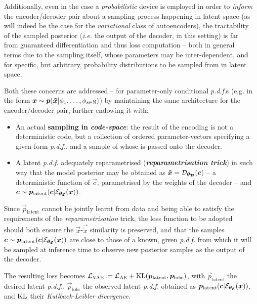 Additionally, even in the case a \textit{probabilistic} device is employed in order to \textit{inform} the encoder/decoder pair about a sampling process happening in latent space (as will indeed be the case for the \textit{variational} class of autoencoders), the tractability of the sampled posterior (\textit{i.e.} the output of the decoder, in this setting) is far from guaranteed \wrt differentiation and thus loss computation -- both in general terms due to the sampling itself, whose parameters may be inter-dependent, and for specific, but arbitrary, probability distributions to be sampled from in latent space.

Both these concerns are addressed -- for parameter-only conditional \textit{p.d.f.}s (e.g. in the form $\bm{x} \sim \bm{p}(\bm{\tilde{x}} | \phi_1, \dots, \phi_{s\in\mathbb{N}})$) by maintaining the same architecture for the encoder/decoder pair, further endowing it with:
\begin{itemize}
    \item An actual \textbf{sampling in \textit{code-space}}: the result of the encoding is not a deterministic code, but a collection of ordered parameter-vectors specifying a given-form \textit{p.d.f.}, and a sample of whose is passed onto the decoder.
    \item A latent \textit{p.d.f.} adequately reparametrised (\textbf{\textit{reparametrisation trick}}) in such way that the model posterior may be obtained as $\bm{\tilde{x}} = \mathcal{D}_{\bm{\theta_{\mathcal{D}}}}(\bm{c})$ -- a deterministic function of $\vec{c}$, parametrised by the weights of the decoder -- and $\bm{c} \sim \bm{p}_{\text{latent}}(\bm{c}| \mathcal{E}_{\bm{\theta_{\mathcal{E}}}}(\bm{x}))$.
\end{itemize}

Since $\vec{p}_{\text{latent}}$ cannot be jointly learnt from data and being able to satisfy the requirements of the \textit{reparametrisation} trick, the loss function to be adopted should both ensure the $\vec{x}$-$\vec{\tilde{x}}$ similarity is preserved, and that the samples $\bm{c} \sim \bm{p}_{\text{latent}}(\bm{c}| \mathcal{E}_{\bm{\theta_{\mathcal{E}}}}(\bm{x}))$ are close to those of a known, given \textit{p.d.f.} from which it will be sampled at inference time to observe new posterior samples as the output of the decoder.

The resulting loss becomes $\mathcal{L}_{\text{VAE}} \coloneqq \mathcal{L}_{\text{AE}} + \operatorname*{\text{KL}}(\bm{p}_{\text{latent}},\bm{p}_{\text{lobs}})$, with $\vec{p}_{\text{latent}}$ the desired latent \textit{p.d.f.}, $\vec{p}_{\text{lobs}}$ the observed latent \textit{p.d.f.} obtained as $\bm{p}_{\text{latent}}(\bm{c}| \mathcal{E}_{\bm{\theta_{\mathcal{E}}}}(\bm{x}))$, and $\operatorname*{\text{KL}}$ their \textit{Kullback-Leibler divergence}.

